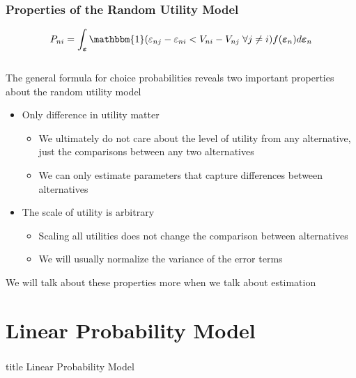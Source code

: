 \documentclass{beamer}
\begin{document}
\begin{frame}\frametitle{Properties of the Random Utility Model}
    $$P_{ni} = \int_{\bm{\varepsilon}} \mathbbm{1}(\varepsilon_{nj} - \varepsilon_{ni} < V_{ni} - V_{nj} \; \forall j \neq i) f(\bm{\varepsilon}_n) d\bm{\varepsilon}_n$$ \\
    \vspace{2ex}
    The general formula for choice probabilities reveals two important properties about the random utility model
    \begin{itemize}
        \item Only difference in utility matter
        \begin{itemize}
            \item We ultimately do not care about the level of utility from any alternative, just the comparisons between any two alternatives
            \item We can only estimate parameters that capture differences between alternatives
        \end{itemize}
        \item The scale of utility is arbitrary
        \begin{itemize}
            \item Scaling all utilities does not change the comparison between alternatives
            \item We will usually normalize the variance of the error terms 
        \end{itemize}
    \end{itemize}
    \vspace{2ex}
    We will talk about these properties more when we talk about estimation
\end{frame}

\section{Linear Probability Model}
\label{lpm}
\begin{frame}\frametitle{}
    \vfill
    \centering
    \begin{beamercolorbox}[center]{title}
        \Large Linear Probability Model
    \end{beamercolorbox}
    \vfill
\end{frame}
\end{document}
